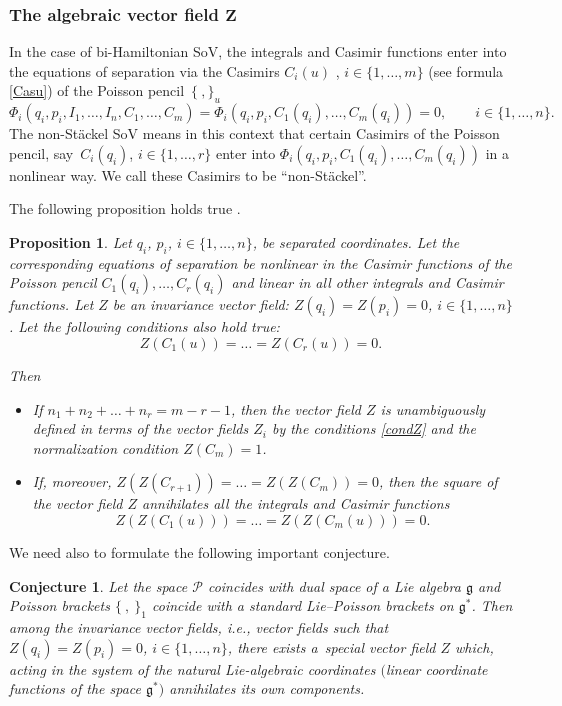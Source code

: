 \documentclass[pdftex]{sigma}
\numberwithin{equation}{section}
\newtheorem{Proposition}[Theorem]{Proposition}
\newtheorem{Conjecture}[Theorem]{Conjecture}
 { \theoremstyle{definition}
\newtheorem{Definition}[Theorem]{Definition}
\newtheorem{Note}[Theorem]{Note}
\newtheorem{Example}[Theorem]{Example}
\newtheorem{Remark}[Theorem]{Remark} }
\begin{document}
\subsubsection[The algebraic vector field Z]{The algebraic vector field $\boldsymbol{Z}$}
In the case of bi-Hamiltonian SoV, the integrals and Casimir functions enter into the equations of separation via the Casimirs $C_i(u)$ , $i\in \{1,\dots, m\}$ (see formula \eqref{Casu}) of the Poisson pencil~$\{\ , \}_u$
\[
\Phi_{i}(q_i,p_i, I_1, \dots ,I_n, C_1, \dots ,C_m)=\Phi_{i}(q_i,p_i, C_1(q_i), \dots ,C_m(q_i))=0, \qquad i\in \{1,\dots, n\}.
\]
The non-St\"ackel SoV means in this context that certain Casimirs of the Poisson pencil, say~$C_i(q_i)$, $i\in \{1,\dots, r\}$ enter into $\Phi_{i}(q_i,p_i, C_1(q_i), \dots ,C_m(q_i))$ in a nonlinear way. We call these Casimirs to be ``non-St\"ackel''.

The following proposition holds true \cite{SkrAsSoVExCle}.

 \begin{Proposition}\label{Z}
 Let $q_i$, $p_i$, $i\in \{1,\dots, n\}$, be separated coordinates. Let the corresponding equations of separation be nonlinear in the Casimir functions of the Poisson pencil $C_1(q_i),\dots ,\allowbreak C_r(q_i)$ and linear in all other integrals and Casimir functions. Let $Z$ be an invariance vector field: $Z(q_i)=Z(p_i)=0$, $i\in \{1,\dots, n\}$. Let the following conditions also hold true:
 \begin{equation}\label{condZ}
 Z(C_1(u))= \dots =Z(C_r(u))=0.
 \end{equation}

 Then
\begin{itemize}\itemsep=0pt
\item[$(i)$] If
 $
n_1+n_2+ \dots +n_r=m-r-1$,
then the vector field $Z$ is unambiguously defined in terms of the vector fields $Z_i$ by the conditions \eqref{condZ} and the normalization condition $Z(C_m)=1$.


\item[$(ii)$] If, moreover, $Z(Z(C_{r+1}))=\dots =Z(Z(C_m))=0$, then the square of the vector field $Z$ annihilates all the integrals and Casimir functions
 \begin{equation}\label{quadZ1}
 Z(Z(C_1(u)))= \dots =Z(Z(C_m(u)))=0.
 \end{equation}
 \end{itemize}
 \end{Proposition}


We need also to formulate the following important conjecture.
\begin{Conjecture}\label{conj2} Let the space $\mathcal{P}$ coincides with dual space of a Lie algebra $\mathfrak{g}$ and Poisson brackets $\{\ ,\ \}_1$ coincide with a standard Lie--Poisson brackets on $\mathfrak{g}^*$.
Then among the invariance vector fields, i.e., vector fields such that $Z(q_i)=Z(p_i)=0$, $i\in \{1, \dots, n\}$, there exists a~special vector field $Z$
 which, acting in the system of the natural Lie-algebraic coordinates $($linear coordinate functions of the space $\mathfrak{g}^*)$ annihilates its own components.
\end{Conjecture}
\end{document}
